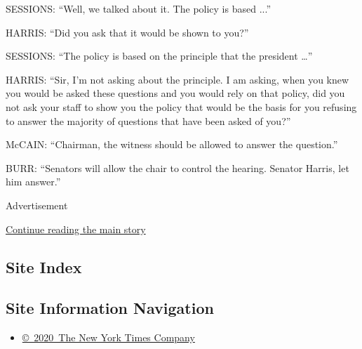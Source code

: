 SESSIONS: ``Well, we talked about it. The policy is based ...''

HARRIS: ``Did you ask that it would be shown to you?''

SESSIONS: ``The policy is based on the principle that the president
\ldots{}''

HARRIS: ``Sir, I'm not asking about the principle. I am asking, when you
knew you would be asked these questions and you would rely on that
policy, did you not ask your staff to show you the policy that would be
the basis for you refusing to answer the majority of questions that have
been asked of you?''

McCAIN: ``Chairman, the witness should be allowed to answer the
question.''

BURR: ``Senators will allow the chair to control the hearing. Senator
Harris, let him answer.''

Advertisement

\protect\hyperlink{after-bottom}{Continue reading the main story}

\hypertarget{site-index}{%
\subsection{Site Index}\label{site-index}}

\hypertarget{site-information-navigation}{%
\subsection{Site Information
Navigation}\label{site-information-navigation}}

\begin{itemize}
\tightlist
\item
  \href{https://help.nytimes3xbfgragh.onion/hc/en-us/articles/115014792127-Copyright-notice}{©~2020~The
  New York Times Company}
\end{itemize}

